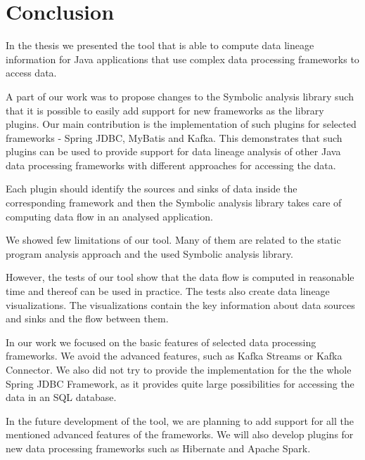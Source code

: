 
\chapter{Conclusion}

In the thesis we presented the \ToolName tool that is able to compute
data lineage information for Java applications that use complex data processing
frameworks to access data.

A part of our work was to propose changes to the Symbolic analysis library
such that it is possible to easily add support for new frameworks as the library plugins.
Our main contribution is the implementation of such plugins
for selected frameworks - Spring JDBC, MyBatis and Kafka.
This demonstrates that such plugins can be used to provide
support for data lineage analysis of other Java data processing frameworks
with different approaches for accessing the data.

Each plugin should identify the sources and sinks of
data inside the corresponding framework and then the Symbolic analysis library takes care of
computing data flow in an analysed application.

We showed few limitations of our \ToolName tool. Many of them
are related to the static program analysis approach and the used
Symbolic analysis library.

However, the tests of our \ToolName tool show that the data flow is
computed in reasonable time and thereof can be used in practice.
The tests also create data lineage visualizations.
The visualizations contain the key information about
data sources and sinks and the flow between them.

In our work we focused on the basic features of selected data processing frameworks.
We avoid the advanced features, such as Kafka Streams or Kafka Connector.
We also did not try to provide the implementation for the the whole Spring JDBC Framework,
as it provides quite large possibilities for accessing the data in an SQL database.

In the future development of the \ToolName tool, we are planning to add support
for all the mentioned advanced features of the frameworks.
We will also develop plugins for new data processing frameworks
such as Hibernate and Apache Spark.


